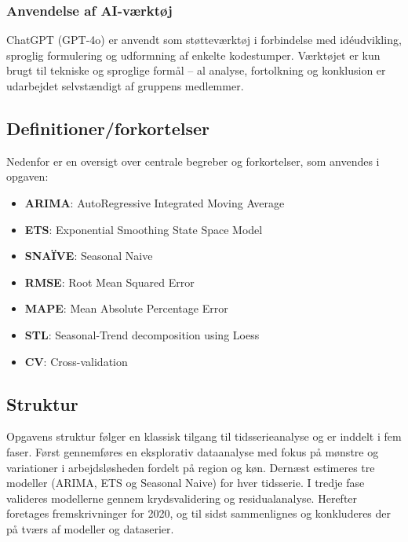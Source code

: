 \documentclass[
]{article}
\providecommand{\tightlist}{%
  \setlength{\itemsep}{0pt}\setlength{\parskip}{0pt}}\usepackage{longtable,booktabs,array}
\begin{document}
\subsubsection{Anvendelse af
AI-værktøj}\label{anvendelse-af-ai-vuxe6rktuxf8j}

ChatGPT (GPT-4o) er anvendt som støtteværktøj i forbindelse med
idéudvikling, sproglig formulering og udformning af enkelte kodestumper.
Værktøjet er kun brugt til tekniske og sproglige formål -- al analyse,
fortolkning og konklusion er udarbejdet selvstændigt af gruppens
medlemmer.

\subsection{Definitioner/forkortelser}\label{definitionerforkortelser}

Nedenfor er en oversigt over centrale begreber og forkortelser, som
anvendes i opgaven:

\begin{itemize}
\tightlist
\item
  \textbf{ARIMA}: AutoRegressive Integrated Moving Average
\item
  \textbf{ETS}: Exponential Smoothing State Space Model
\item
  \textbf{SNAÏVE}: Seasonal Naive
\item
  \textbf{RMSE}: Root Mean Squared Error
\item
  \textbf{MAPE}: Mean Absolute Percentage Error
\item
  \textbf{STL}: Seasonal-Trend decomposition using Loess
\item
  \textbf{CV}: Cross-validation
\end{itemize}

\subsection{Struktur}\label{struktur}

Opgavens struktur følger en klassisk tilgang til tidsserieanalyse og er
inddelt i fem faser. Først gennemføres en eksplorativ dataanalyse med
fokus på mønstre og variationer i arbejdsløsheden fordelt på region og
køn. Dernæst estimeres tre modeller (ARIMA, ETS og Seasonal Naive) for
hver tidsserie. I tredje fase valideres modellerne gennem
krydsvalidering og residualanalyse. Herefter foretages fremskrivninger
for 2020, og til sidst sammenlignes og konkluderes der på tværs af
modeller og dataserier.
\end{document}
